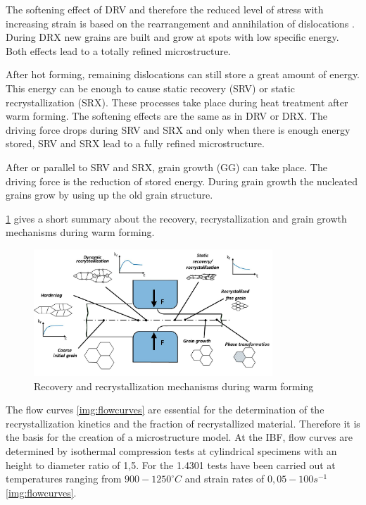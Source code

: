 The softening effect of DRV and therefore the reduced level of stress with increasing strain is based on the rearrangement and annihilation of dislocations \cite{GOT07}. During DRX new grains are built and grow at spots with low specific energy. Both effects lead to a totally refined microstructure.\par

After hot forming, remaining dislocations can still store a great amount of energy. This energy can be enough to cause static recovery (SRV) or static recrystallization (SRX). These processes take place during heat treatment after warm forming. The softening effects are the same as in DRV or DRX. The driving force drops during SRV and SRX and only when there is enough energy stored, SRV and SRX lead to a fully refined microstructure.\par 

After or parallel to SRV and SRX, grain growth (GG) can take place. The driving force is the reduction of stored energy. During grain growth the nucleated grains grow by using up the old grain structure.\par 

\ref{img:recovandrecrystwarmforming} gives a short summary about the recovery, recrystallization and grain growth mechanisms during warm forming.

\begin{figure}[htbp]
 \centering
 \includegraphics[width=0.8\textwidth]{images/recovandrecrystwarmforming}
 \caption{Recovery and recrystallization mechanisms during warm forming}
 \label{img:recovandrecrystwarmforming}
\end{figure}

The flow curves \ref{img:flowcurves} are essential for the determination of the recrystallization kinetics and the fraction of recrystallized material. Therefore it is the basis for the creation of a microstructure model. At the IBF, flow curves are determined by isothermal compression tests at cylindrical specimens with an height to diameter ratio of 1,5. For the 1.4301 tests have been carried out at temperatures ranging from $900 - 1250 ^{\circ}C$ and strain rates of $0,05 - 100 s^{-1}$ \ref{img:flowcurves}.


